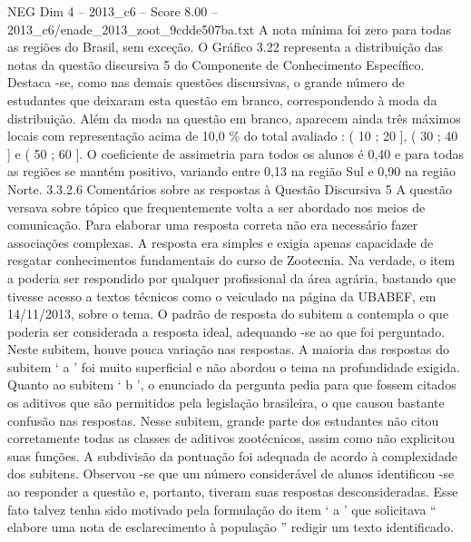 \begin{textsample}{NEG Dim 4 – 2013\_c6 – Score 8.00 – 2013\_c6/enade\_2013\_zoot\_9cdde507ba.txt}
A nota mínima foi zero para todas as regiões do Brasil, sem exceção.
O Gráfico 3.22 representa a distribuição das notas da questão discursiva 5 do Componente de Conhecimento Específico.
Destaca -se, como nas demais questões discursivas, o grande número de estudantes que deixaram esta questão em branco, correspondendo à moda da distribuição.
Além da moda na questão em branco, aparecem ainda três máximos locais com representação acima de 10,0 \% do total avaliado : ( 10 ; 20 ], ( 30 ; 40 ] e ( 50 ; 60 ].
O coeficiente de assimetria para todos os alunos é 0,40 e para todas as regiões se mantém positivo, variando entre 0,13 na região Sul e 0,90 na região Norte. 3.3.2.6 Comentários sobre as respostas à Questão Discursiva 5 A questão versava sobre tópico que frequentemente volta a ser abordado nos meios de comunicação.
Para elaborar uma resposta correta não era necessário fazer associações complexas.
A resposta era simples e exigia apenas capacidade de resgatar conhecimentos fundamentais do curso de Zootecnia.
Na verdade, o item a poderia ser respondido por qualquer profissional da área agrária, bastando que tivesse acesso a textos técnicos como o veiculado na página da UBABEF, em 14/11/2013, sobre o tema.
O padrão de resposta do subitem a contempla o que poderia ser considerada a resposta ideal, adequando -se ao que foi perguntado.
Neste subitem, houve pouca variação nas respostas.
A maioria das respostas do subitem ‘ a ’ foi muito superficial e não abordou o tema na profundidade exigida.
Quanto ao subitem ‘ b ’, o enunciado da pergunta pedia para que fossem citados os aditivos que são permitidos pela legislação brasileira, o que causou bastante confusão nas respostas.
Nesse subitem, grande parte dos estudantes não citou corretamente todas as classes de aditivos zootécnicos, assim como não explicitou suas funções.
A subdivisão da pontuação foi adequada de acordo à complexidade dos subitens.
Observou -se que um número considerável de alunos identificou -se ao responder a questão e, portanto, tiveram suas respostas desconsideradas.
Esse fato talvez tenha sido motivado pela formulação do item ‘ a ’ que solicitava “ elabore uma nota de esclarecimento à população ” redigir um texto identificado.

\end{textsample}
